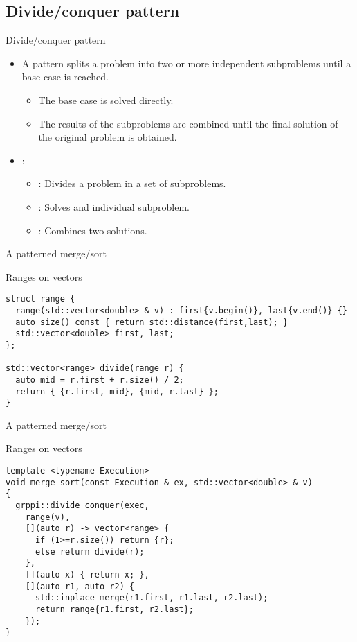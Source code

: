 \subsection{Divide/conquer pattern}

\begin{frame}[t]{Divide/conquer pattern}
\begin{itemize}
  \item A  pattern splits a problem into two or more independent subproblems until a base case is reached.
    \begin{itemize}
      \item The base case is solved directly.
      \item The results of the subproblems are combined until the final solution of the original problem is obtained.
    \end{itemize}

  \vfill\pause
  \item {}:
    \begin{itemize}
      \item {}: Divides a problem in a set of subproblems.
      \item {}: Solves and individual subproblem.
      \item {}: Combines two solutions.
    \end{itemize}
\end{itemize}
\end{frame}

\begin{frame}[t,fragile]{A patterned merge/sort}
\begin{block}{Ranges on vectors}
\begin{lstlisting}
struct range {
  range(std::vector<double> & v) : first{v.begin()}, last{v.end()} {}
  auto size() const { return std::distance(first,last); }
  std::vector<double> first, last;
};

std::vector<range> divide(range r) {
  auto mid = r.first + r.size() / 2;
  return { {r.first, mid}, {mid, r.last} };
}
\end{lstlisting}
\end{block}
\end{frame}

\begin{frame}[t,fragile]{A patterned merge/sort}
\begin{block}{Ranges on vectors}
\begin{lstlisting}
template <typename Execution>
void merge_sort(const Execution & ex, std::vector<double> & v)
{
  grppi::divide_conquer(exec,
    range(v),
    [](auto r) -> vector<range> {
      if (1>=r.size()) return {r};
      else return divide(r);
    },
    [](auto x) { return x; },
    [](auto r1, auto r2) {
      std::inplace_merge(r1.first, r1.last, r2.last);
      return range{r1.first, r2.last};
    });
}
\end{lstlisting}
\end{block}
\end{frame}
